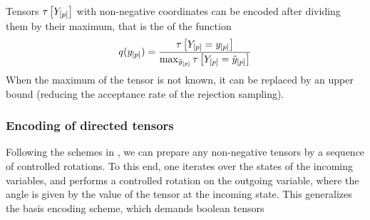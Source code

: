 \documentclass[aps,onecolumn,nofootinbib,pra]{article}
\newtheorem{definition}{Definition}
\begin{document}


    Tensors $\tau\left[Y_{[p]}\right]$ with non-negative coordinates can be encoded after dividing them by their maximum, that is the \activationCircuit{} of the function
    \begin{align*}
        q(y_{[p]}) = \frac{\tau\left[Y_{[p]}=y_{[p]}\right]}{\max_{\tilde{y}_{[p]}} \tau\left[Y_{[p]}=\tilde{y}_{[p]}\right]}
    \end{align*}
    When the maximum of the tensor is not known, it can be replaced by an upper bound (reducing the acceptance rate of the rejection sampling).

    \subsubsection{Encoding of directed tensors}

    Following the schemes in \cite{low_quantum_2014}, we can prepare any non-negative tensors by a sequence of controlled rotations.
    To this end, one iterates over the states of the incoming variables, and performs a controlled rotation on the outgoing variable, where the angle is given by the value of the tensor at the incoming state.
    This generalizes the basis encoding scheme, which demands boolean tensors
\end{document}
